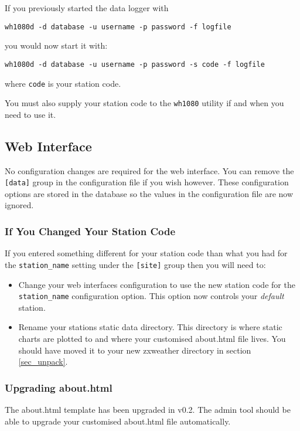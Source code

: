 \documentclass[a4paper,10pt,draft]{book}
\begin{document}
If you previously started the data logger with
\begin{verbatim}
wh1080d -d database -u username -p password -f logfile
\end{verbatim}

you would now start it with:
\begin{verbatim}
wh1080d -d database -u username -p password -s code -f logfile
\end{verbatim}
where \verb|code| is your station code.

You must also supply your station code to the \verb|wh1080| utility if and when you need to use it.

\subsection{Web Interface}
No configuration changes are required for the web interface. You can remove the \verb|[data]| group in the configuration file if you wish however. These configuration options are stored in the database so the values in the configuration file are now ignored.

\subsubsection{If You Changed Your Station Code}
If you entered something different for your station code than what you had for the \verb|station_name| setting under the \verb|[site]| group then you will need to:
\begin{itemize}
\item Change your web interfaces configuration to use the new station code for the \verb|station_name| configuration option. This option now controls your \emph{default} station.
\item Rename your stations static data directory. This directory is where static charts are plotted to and where your customised about.html file lives. You should have moved it to your new zxweather directory in section \ref{sec_unpack}.
\end{itemize}

\subsubsection{Upgrading about.html}
The about.html template has been upgraded in v0.2. The admin tool should be able to upgrade your customised about.html file automatically.
\end{document}
